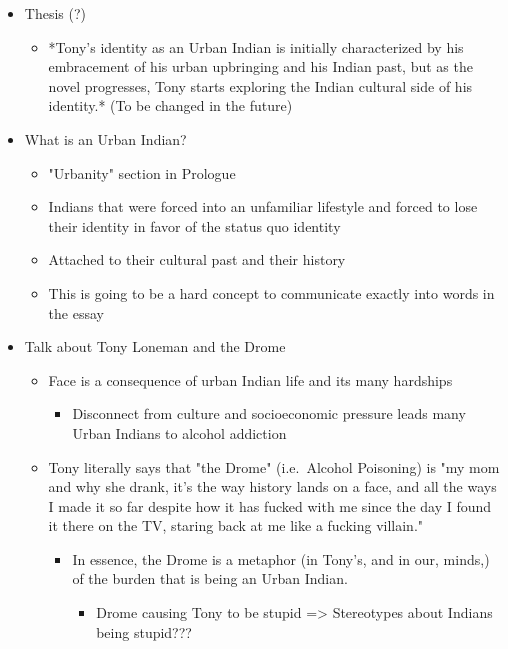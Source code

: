 \documentclass[letterpaper]{article}
\begin{document}
\begin{itemize}
\item Thesis (?)

\begin{itemize}
\item *Tony's identity as an Urban Indian is initially characterized by
his embracement of his urban upbringing and his Indian past, but as
the novel progresses, Tony starts exploring the Indian cultural side
of his identity.* (To be changed in the future)
\end{itemize}

\item What is an Urban Indian?

\begin{itemize}
\item "Urbanity" section in Prologue
\item Indians that were forced into an unfamiliar lifestyle and forced to
lose their identity in favor of the status quo identity
\item Attached to their cultural past and their history
\item This is going to be a hard concept to communicate exactly into words
in the essay
\end{itemize}

\item Talk about Tony Loneman and the Drome

\begin{itemize}
\item Face is a consequence of urban Indian life and its many hardships

\begin{itemize}
\item Disconnect from culture and socioeconomic pressure leads many
Urban Indians to alcohol addiction
\end{itemize}

\item Tony literally says that "the Drome" (i.e. Alcohol Poisoning) is "my
mom and why she drank, it's the way history lands on a face, and all
the ways I made it so far despite how it has fucked with me since
the day I found it there on the TV, staring back at me like a
fucking villain."

\begin{itemize}
\item In essence, the Drome is a metaphor (in Tony's, and in our,
minds,) of the burden that is being an Urban Indian.

\begin{itemize}
\item Drome causing Tony to be stupid => Stereotypes about Indians
being stupid???
\end{itemize}


\end{itemize}
\end{itemize}
\end{itemize}
\end{document}
